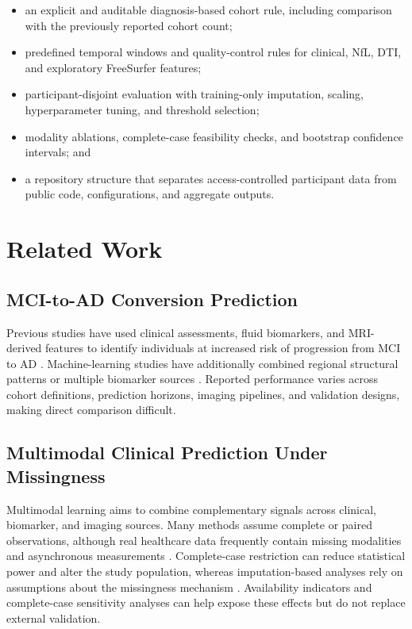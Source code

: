 \documentclass[preprint,12pt]{elsarticle}
\begin{document}
\begin{itemize}
    \item an explicit and auditable diagnosis-based cohort rule, including comparison with the previously reported cohort count;
    \item predefined temporal windows and quality-control rules for clinical, NfL, DTI, and exploratory FreeSurfer features;
    \item participant-disjoint evaluation with training-only imputation, scaling, hyperparameter tuning, and threshold selection;
    \item modality ablations, complete-case feasibility checks, and bootstrap confidence intervals; and
    \item a repository structure that separates access-controlled participant data from public code, configurations, and aggregate outputs.
\end{itemize}

\section{Related Work}
\label{sec:related_work}

\subsection{MCI-to-AD Conversion Prediction}

Previous studies have used clinical assessments, fluid biomarkers, and MRI-derived features to identify individuals at increased risk of progression from MCI to AD \cite{jackPredictionADMRIBased1999,christosdavatzikosPredictionMCIAD2011,shannonl.risacherBaselineMRIPredictors2009,cynthiam.stonningtonPredictingClinicalScores2010}. Machine-learning studies have additionally combined regional structural patterns or multiple biomarker sources \cite{eskildsenPredictionAlzheimersDisease2013,moradiMachineLearningFramework2015,basaia2019automated,viswanathdevanarayanPredictingClinicalProgression2024,t.r.liPredictionModelDementia2024}. Reported performance varies across cohort definitions, prediction horizons, imaging pipelines, and validation designs, making direct comparison difficult.

\subsection{Multimodal Clinical Prediction Under Missingness}

Multimodal learning aims to combine complementary signals across clinical, biomarker, and imaging sources. Many methods assume complete or paired observations, although real healthcare data frequently contain missing modalities and asynchronous measurements \cite{multimodal2021early,michalgolovanevskyMultimodalAttentionbasedDeep2022,jinzhangMultimodalCrossattentionNetwork2023}. Complete-case restriction can reduce statistical power and alter the study population, whereas imputation-based analyses rely on assumptions about the missingness mechanism \cite{Little2019,Janssen2010,austinMissingDataClinical2021}. Availability indicators and complete-case sensitivity analyses can help expose these effects but do not replace external validation.
\end{document}
